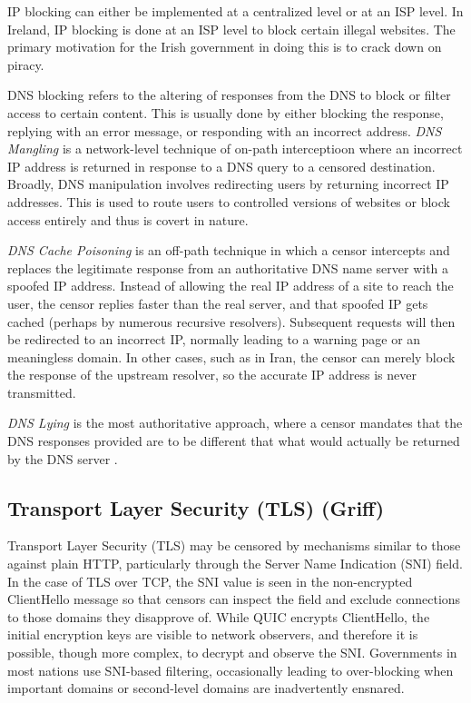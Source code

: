 IP blocking can either be implemented at a centralized level or at an ISP level. In Ireland, IP blocking is done at an ISP level to block certain illegal websites. The primary motivation for the Irish government in doing this is to crack down on piracy. 

DNS blocking refers to the altering of responses from the DNS to block or filter access to certain content. This is usually done by either blocking the response, replying with an error message, or responding with an incorrect address. \textit{DNS Mangling} is a network-level technique of on-path interceptioon where an incorrect IP address is returned in response to a DNS query to a censored destination. Broadly, DNS manipulation involves redirecting users by returning incorrect IP addresses. This is used to route users to controlled versions of websites or block access entirely and thus is covert in nature.

\textit{DNS Cache Poisoning} is an off-path technique in which a censor intercepts and replaces the legitimate response from an authoritative DNS name server with a spoofed IP address. Instead of allowing the real IP address of a site to reach the user, the censor replies faster than the real server, and that spoofed IP gets cached (perhaps by numerous recursive resolvers). Subsequent requests will then be redirected to an incorrect IP, normally leading to a warning page or an meaningless domain. In other cases, such as in Iran, the censor can merely block the response of the upstream resolver, so the accurate IP address is never transmitted.

\textit{DNS Lying} is the most authoritative approach, where a censor mandates that the DNS responses provided are to be different that what would actually be returned by the DNS server \cite{rfc9505}.

\subsection{Transport Layer Security (TLS) (Griff)}

Transport Layer Security (TLS) may be censored by mechanisms similar to those against plain HTTP, particularly through the Server Name Indication (SNI) field. In the case of TLS over TCP, the SNI value is seen in the non-encrypted ClientHello message so that censors can inspect the field and exclude connections to those domains they disapprove of. While QUIC encrypts ClientHello, the initial encryption keys are visible to network observers, and therefore it is possible, though more complex, to decrypt and observe the SNI. Governments in most nations use SNI-based filtering, occasionally leading to over-blocking when important domains or second-level domains are inadvertently ensnared.

